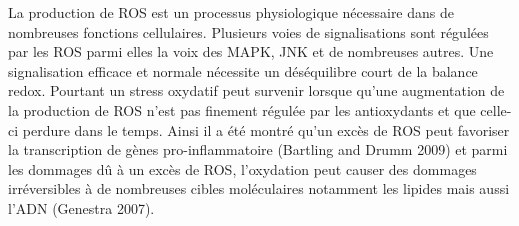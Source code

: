 La production de ROS est un processus physiologique nécessaire dans de nombreuses fonctions cellulaires. Plusieurs voies de signalisations sont régulées par les ROS parmi elles la voix des MAPK, JNK et de nombreuses autres. Une signalisation efficace et normale nécessite un déséquilibre court de la balance redox. Pourtant un stress oxydatif peut survenir lorsque qu’une augmentation de la production de ROS n’est pas finement régulée par les antioxydants et que celle-ci perdure dans le temps. 
Ainsi il a été montré qu’un excès de ROS peut favoriser la transcription de gènes pro-inflammatoire (Bartling and Drumm 2009)\cite{bartling_oxidative_2009} et parmi les dommages dû à un excès de ROS, l’oxydation peut causer des dommages irréversibles à de nombreuses cibles moléculaires notamment les lipides mais aussi l’ADN (Genestra 2007)\cite{genestra_oxyl_2007}.




